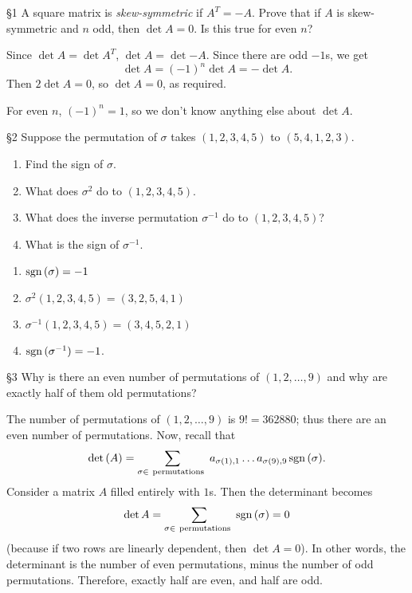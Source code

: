 \documentclass{review-sheet}
\begin{document}
\begin{problem}{\S 1}
  A square matrix is \textit{skew-symmetric} if $A^T=-A$. Prove that if $A$ is skew-symmetric and
  $n$ odd, then $\det{A}=0$. Is this true for even $n$?
\end{problem}
\begin{solution}
  Since $\det{A}=\det{A^T}$, $\det{A}=\det{-A}$. Since there are odd $-1$s, we get \[
    \det{A}=(-1)^n\det{A}=-\det{A}
  .\] Then $2\det{A}=0$, so $\det{A}=0$, as required.

  For even $n$, $(-1)^n=1$, so we don't know anything else about $\det{A}$.
\end{solution}

\begin{problem}{\S 2}
  Suppose the permutation of $\sigma$ takes $(1,2,3,4,5)$ to $(5,4,1,2,3)$.
  \begin{enumerate}[label=(\alph*)]
    \item Find the sign of $\sigma$.
    \item What does $\sigma^2$ do to $(1,2,3,4,5)$.
    \item What does the inverse permutation $\sigma^{-1}$ do to $(1,2,3,4,5)$?
    \item What is the sign of $\sigma^{-1}$.
  \end{enumerate}
\end{problem}
\begin{solution}
  \begin{enumerate}[label=(\alph*)]
    \item $\operatorname{sgn}{(\sigma)}=-1$
    \item $\sigma^2(1,2,3,4,5)=(3,2,5,4,1)$
    \item $\sigma^{-1}(1,2,3,4,5)=(3,4,5,2,1)$
    \item $\operatorname{sgn}{(\sigma^{-1})}=-1$.
  \end{enumerate}
\end{solution}

\begin{problem}{\S 3}
  Why is there an even number of permutations of $(1,2,\ldots,9)$ and why are exactly half of them
  old permutations?
\end{problem}
\begin{solution}
  The number of permutations of $(1,2,\ldots,9)$ is $9!=362880$; thus there are an even number of
  permutations. Now, recall that \[
    \det{(A)}=\sum_{\sigma\in ~\text{permutations}~}
    a_{\sigma(1),1}\ldots a_{\sigma(9),9}\operatorname{sgn}{(\sigma)}
  .\] Consider a matrix $A$ filled entirely with $1$s. Then the determinant becomes \[
  \det{A}=\sum_{\sigma\in ~\text{permutations}~} \operatorname{sgn}{(\sigma)}=0
\] (because if two rows are linearly dependent, then $\det{A}=0$). In other words, the determinant
is the number of even permutations, minus the number of odd permutations. Therefore, exactly half
are even, and half are odd.
\end{solution}
\end{document}
